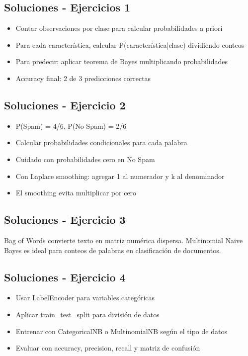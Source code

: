 \documentclass[12pt]{article}
\begin{document}
\subsection{Soluciones - Ejercicios 1}

\begin{itemize}
    \item Contar observaciones por clase para calcular probabilidades a priori
    \item Para cada característica, calcular P(característica|clase) dividiendo conteos
    \item Para predecir: aplicar teorema de Bayes multiplicando probabilidades
    \item Accuracy final: 2 de 3 predicciones correctas
\end{itemize}

\subsection{Soluciones - Ejercicio 2}

\begin{itemize}
    \item P(Spam) = 4/6, P(No Spam) = 2/6
    \item Calcular probabilidades condicionales para cada palabra
    \item Cuidado con probabilidades cero en No Spam
    \item Con Laplace smoothing: agregar 1 al numerador y k al denominador
    \item El smoothing evita multiplicar por cero
\end{itemize}

\subsection{Soluciones - Ejercicio 3}

Bag of Words convierte texto en matriz numérica dispersa. Multinomial Naive Bayes es ideal para conteos de palabras en clasificación de documentos.

\subsection{Soluciones - Ejercicio 4}

\begin{itemize}
    \item Usar LabelEncoder para variables categóricas
    \item Aplicar train\_test\_split para división de datos
    \item Entrenar con CategoricalNB o MultinomialNB según el tipo de datos
    \item Evaluar con accuracy, precision, recall y matriz de confusión
\end{itemize}
\end{document}

